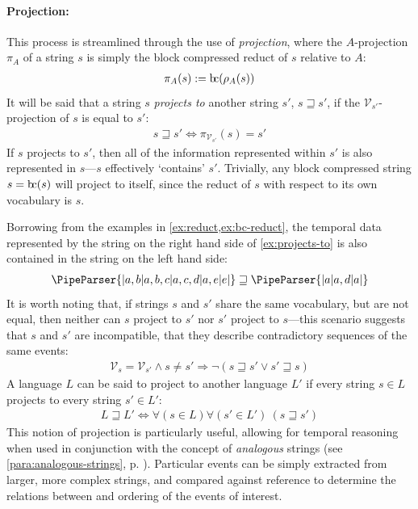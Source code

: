 \documentclass[a4paper,12pt,leqno]{article}
\newcommand{\bc}{{\rm b\!c}}
\newcommand{\vph}[1]{\vphantom{#1}}
\newcommand{\ebox}[1]{\fbox{$\vph{'(),}#1$}}
\newcommand{\V}{\mathcal{V}}
\newcommand{\EventString}[1]{%
	\renewcommand*{\do}[1]{\ebox{##1}}%
	\PipeParser{#1}%
}
\begin{document}
\paragraph{Projection:}\label{para:str-op-projection}
This process is streamlined through the use of \textit{projection}, where the $A$-projection $\pi_A$ of a string $s$ is simply the block compressed reduct of $s$ relative to $A$:
\begin{align}
	\pi_A(s) := \bc(\rho_A(s))
\end{align}
It will be said that a string $s$ \textit{projects to} another string $s'$, $s \sqsupseteq s'$, if the $\V_{s'}$-projection of $s$ is equal to $s'$:
\begin{align}
	s \sqsupseteq s' \Longleftrightarrow  \pi_{\V_{s'}}(s) = s'\label{def:projection}
\end{align}
If $s$ projects to $s'$, then all of the information represented within $s'$ is also represented in $s$---$s$ effectively `contains' $s'$. Trivially, any block compressed string $s = \bc(s)$ will project to itself, since the reduct of $s$ with respect to its own vocabulary is $s$.

Borrowing from the examples in \cref{ex:reduct,ex:bc-reduct}, the temporal data represented by the string on the right hand side of \cref{ex:projects-to} is also contained in the string on the left hand side:
\begin{align}\label{ex:projects-to}
	\EventString{{}|a,b|a,b,c|a,c,d|a,e|e|{}} \sqsupseteq \EventString{{}|a|a,d|a|{}}
\end{align}
It is worth noting that, if strings $s$ and $s'$ share the same vocabulary, but are not equal, then neither can $s$ project to $s'$ nor $s'$ project to $s$---this scenario suggests that $s$ and $s'$ are incompatible, that they describe contradictory sequences of the same events:
\begin{align}\label{impl:cannot-project}
	\V_s = \V_{s'} \wedge s \neq s' \Longrightarrow \lnot (s \sqsupseteq s' \lor s' \sqsupseteq s)
\end{align}
A language $L$ can be said to project to another language $L'$ if every string $s \in L$ projects to every string $s' \in L'$:
\begin{align}
	L \sqsupseteq L' \Longleftrightarrow  \forall (s \in L)\forall (s' \in L')~ (s \sqsupseteq s')\label{def:lang-projection}
\end{align}
This notion of projection is particularly useful, allowing for temporal reasoning when used in conjunction with the concept of \textit{analogous} strings (see \cref{para:analogous-strings}, p. \pageref{para:analogous-strings}). Particular events can be simply extracted from larger, more complex strings, and compared against reference to determine the relations between and ordering of the events of interest.
\end{document}

